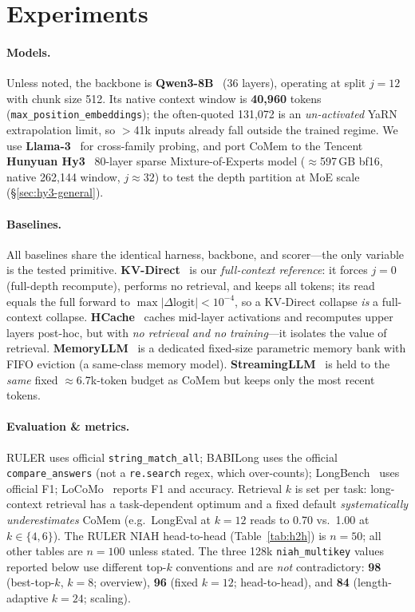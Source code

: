 \section{Experiments}
\label{sec:experiments}

\paragraph{Models.} Unless noted, the backbone is \textbf{Qwen3-8B}~\citep{qwen3}
(36 layers), operating at split $j{=}12$ with chunk size 512. Its native context
window is \textbf{40{,}960} tokens (\texttt{max\_position\_embeddings}); the
often-quoted 131{,}072 is an \emph{un-activated} YaRN extrapolation limit, so
$>$41k inputs already fall outside the trained regime. We use
\textbf{Llama-3}~\citep{llama3} for cross-family probing, and port CoMem to the
Tencent \textbf{Hunyuan Hy3}~\citep{hunyuan} 80-layer sparse
Mixture-of-Experts model ($\approx$597\,GB bf16, native 262{,}144 window,
$j{\approx}32$) to test the depth partition at MoE scale
(\S\ref{sec:hy3-general}).

\paragraph{Baselines.} All baselines share the identical harness, backbone, and
scorer---the only variable is the tested primitive.
\textbf{KV-Direct}~\citep{kvdirect} is our \emph{full-context reference}: it
forces $j{=}0$ (full-depth recompute), performs no retrieval, and keeps all
tokens; its read equals the full forward to $\max|\Delta\text{logit}|<10^{-4}$,
so a KV-Direct collapse \emph{is} a full-context collapse. \textbf{HCache}~\citep{hcache}
caches mid-layer activations and recomputes upper layers post-hoc, but with
\emph{no retrieval and no training}---it isolates the value of retrieval.
\textbf{MemoryLLM}~\citep{memoryllm} is a dedicated fixed-size parametric memory
bank with FIFO eviction (a same-class memory model). \textbf{StreamingLLM}~\citep{streamingllm}
is held to the \emph{same} fixed $\approx$6.7k-token budget as CoMem but keeps
only the most recent tokens.

\paragraph{Evaluation \& metrics.} RULER uses official
\texttt{string\_match\_all}; BABILong uses the official
\texttt{compare\_answers} (not a \texttt{re.search} regex, which over-counts);
LongBench~\citep{longbench} uses official F1; LoCoMo~\citep{locomo} reports F1 and accuracy. Retrieval $k$ is set
per task: long-context retrieval has a task-dependent optimum and a fixed
default \emph{systematically underestimates} CoMem (e.g.\ LongEval at $k{=}12$
reads to 0.70 vs.\ 1.00 at $k{\in}\{4,6\}$). The RULER NIAH head-to-head
(Table~\ref{tab:h2h}) is $n{=}50$; all other tables are $n{=}100$ unless stated.
The three 128k \texttt{niah\_multikey} values reported below use different top-$k$
conventions and are \emph{not} contradictory: \textbf{98} (best-top-$k$, $k{=}8$;
overview), \textbf{96} (fixed $k{=}12$; head-to-head), and \textbf{84}
(length-adaptive $k{=}24$; scaling).

